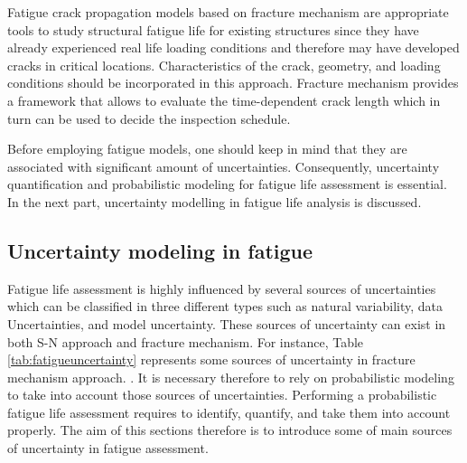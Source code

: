 \noindent
Fatigue crack propagation models based on fracture mechanism are appropriate tools to study structural fatigue life for existing structures since they have already experienced real life loading conditions
and therefore may have developed cracks in critical locations. Characteristics of the crack, geometry, and loading conditions should be incorporated in this approach. Fracture mechanism provides a 
framework that allows to evaluate the time-dependent crack length which in turn can be used to decide the inspection schedule. 

Before employing fatigue models, one should keep in mind that they are associated with significant amount of uncertainties. Consequently, uncertainty quantification and probabilistic modeling 
for fatigue life assessment is essential. In the next part, uncertainty modelling in fatigue life analysis is discussed. 


\subsection{Uncertainty modeling in fatigue}

\noindent
Fatigue life assessment is highly influenced by several sources of uncertainties which can be classified in three different types such as natural variability, data Uncertainties, and model uncertainty. 
These sources of uncertainty can exist in both S-N approach and fracture mechanism. For instance, Table \ref{tab:fatigueuncertainty} represents some sources of uncertainty in fracture mechanism approach. 
\citep{Sankararaman2009, LING2011868}. It is necessary therefore to rely on probabilistic modeling to take into account those sources of uncertainties. Performing a probabilistic fatigue life assessment 
requires to identify, quantify, and take them into account properly. The aim of this sections therefore is to introduce some of main sources of uncertainty in fatigue assessment. 

